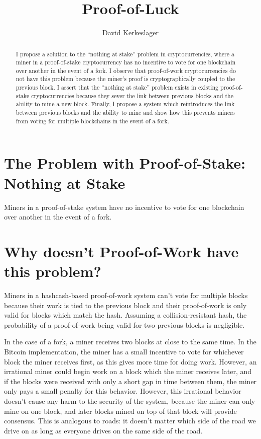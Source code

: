 \documentclass{article}
\begin{document}
\title{Proof-of-Luck}

\author{David Kerkeslager}

\maketitle

\begin{abstract}
I propose a solution to the ``nothing at stake'' problem \cite{ethereum_problems} in cryptocurrencies, where a miner in a proof-of-stake cryptocurrency \cite{peercoin_paper} has no incentive to vote for one blockchain over another in the event of a fork. I observe that proof-of-work cryptocurrencies \cite{bitcoin_paper} do not have this problem because the miner's proof is cryptographically coupled to the previous block. I assert that the ``nothing at stake'' problem exists in existing proof-of-stake cryptocurrencies because they sever the link between previous blocks and the ability to mine a new block. Finally, I propose a system which reintroduces the link between previous blocks and the ability to mine and show how this prevents miners from voting for multiple blockchains in the event of a fork.
\end{abstract}

\newpage

\section{The Problem with Proof-of-Stake: Nothing at Stake}

Miners in a proof-of-stake system have no incentive to vote for one blockchain over another in the event of a fork.

\section{Why doesn't Proof-of-Work have this problem?}

Miners in a hashcash-based proof-of-work system can't vote for multiple blocks because their work is tied to the previous block and their proof-of-work is only valid for blocks which match the hash. Assuming a collision-resistant hash, the probability of a proof-of-work being valid for two previous blocks is negligible.

In the case of a fork, a miner receives two blocks at close to the same time. In the Bitcoin implementation, the miner has a small incentive to vote for whichever block the miner receives first, as this gives more time for doing work. However, an irrational miner could begin work on a block which the miner receives later, and if the blocks were received with only a short gap in time between them, the miner only pays a small penalty for this behavior. However, this irrational behavior doesn't cause any harm to the security of the system, because the miner can only mine on one block, and later blocks mined on top of that block will provide consensus. This is analogous to roads: it doesn't matter which side of the road we drive on as long as everyone drives on the same side of the road.
\end{document}
